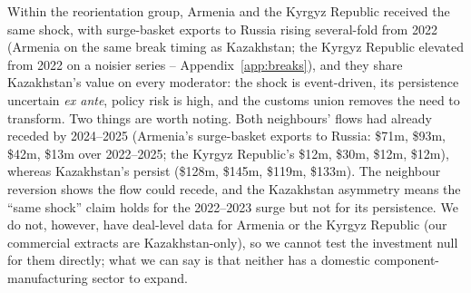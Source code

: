 \documentclass[12pt]{article}
\begin{document}
Within the reorientation group, Armenia and the Kyrgyz Republic received the same
shock, with surge-basket exports to Russia rising several-fold from 2022 (Armenia on the same
break timing as Kazakhstan; the Kyrgyz Republic elevated from 2022 on a noisier series --
Appendix~\ref{app:breaks}), and they share Kazakhstan's value on every moderator: the shock is event-driven,
its persistence uncertain \emph{ex ante}, policy risk is high, and the customs union removes
the need to transform. Two things are worth noting. Both neighbours' flows had already
receded by 2024--2025 (Armenia's surge-basket exports to Russia: \$71m, \$93m, \$42m, \$13m
over 2022--2025; the Kyrgyz Republic's \$12m, \$30m, \$12m, \$12m), whereas Kazakhstan's
persist (\$128m, \$145m, \$119m, \$133m). The neighbour reversion shows the flow could recede,
and the Kazakhstan asymmetry means the ``same shock'' claim holds for the 2022--2023 surge
but not for its persistence. We do not, however, have deal-level data for Armenia
or the Kyrgyz Republic (our commercial extracts are Kazakhstan-only), so we cannot test the
investment null for them directly; what we can say is that neither has a domestic
component-manufacturing sector to expand.
\end{document}
